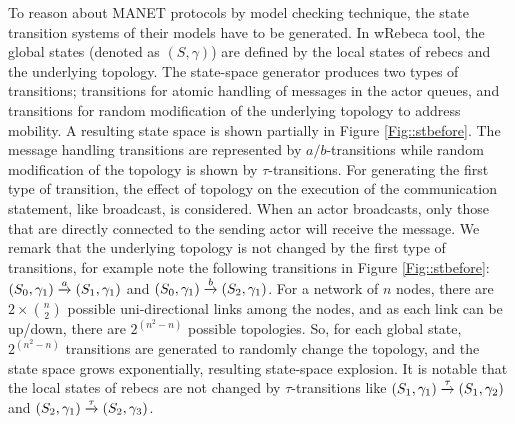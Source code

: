 To reason about MANET protocols by  model checking technique, the state transition systems of their models have to be generated. In wRebeca tool, the global states (denoted as $(S,\gamma)$) are defined by the local states of rebecs and the underlying topology.
%
The state-space generator produces two types of transitions; transitions for atomic handling of messages in the actor queues, and transitions for random modification of the underlying topology to address mobility. A resulting state space %
is shown partially in Figure \ref{Fig::stbefore}. The message handling transitions are represented by $a/b$-transitions while random modification of the topology is shown by $\tau$-transitions. %
For generating the first type of transition, the effect of topology on the execution of the communication statement, like broadcast, is considered.
When an actor broadcasts, only those that are directly connected to the sending actor will receive the message. We remark that the underlying topology is not changed by the first type of transitions, for example note the following transitions in Figure \ref{Fig::stbefore}:  $(S_0,\gamma_1)\overto{a}(S_1,\gamma_1)$  and $(S_0,\gamma_1)\overto{b}(S_2,\gamma_1)$. For a network of $n$ nodes, there are $2\times {n \choose 2}$ possible  uni-directional links among the nodes, and as each link can be up/down, there are $2^{(n^2-n)}$ possible topologies. So, for each global state, $2^{(n^2-n)}$ transitions are generated to randomly change the topology, and the state space grows exponentially, resulting state-space explosion. It is notable that the local states of rebecs are not changed by $\tau$-transitions like $(S_1,\gamma_1)\overto{\tau}(S_1,\gamma_2)$ and $(S_2,\gamma_1)\overto{\tau}(S_2,\gamma_3)$.

